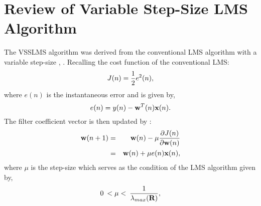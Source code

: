 \section{Review of Variable Step-Size LMS Algorithm}\label{sec:4.2}
\vspace{-0.5cm}
\noindent The VSSLMS algorithm was derived from the conventional LMS algorithm with a variable step-size \cite{Harris}, \cite{Evans}. Recalling the cost function of the conventional LMS:
\vspace{-0.1cm}
\begin{equation}
J(n)=\frac{1}{2}e^2(n),\label{eq2}\vspace{-0.1cm}
\end{equation}
\noindent where $e(n)$ is the instantaneous error and is given by,
\vspace{-0.1cm}
\begin{equation}
e(n)=y(n)-\textbf{w}^T(n)\textbf{x}(n).\label{eq3}\vspace{-0.1cm}
\end{equation}
\noindent The filter coefficient vector is then updated by \cite{sayed}:
\vspace{-0.1cm}
\begin{eqnarray}
\nonumber
\textbf{w}(n+1)&=&\textbf{w}(n)-\mu\frac{\partial J(n)}{\partial\textbf{w}(n)}\\
&=&\textbf{w}(n)+\mu e(n)\textbf{x}(n),\label{eq4}\vspace{-0.1cm}
\end{eqnarray}
\noindent where $\mu$ is the step-size which serves as the condition of the LMS algorithm given by,
\vspace{-0.1cm}
\begin{equation}
0\hspace{2pt}<\mu<\hspace{2pt}\frac{1}{\lambda_{max}(\textbf{R})},\label{eq5}\vspace{-0.1cm}
\end{equation}
